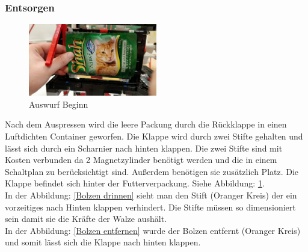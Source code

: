 \subsubsection{Entsorgen}

\begin{figure}
\vspace{-30pt}
  \begin{center}
    \includegraphics[width=0.50\textwidth]{Bilder/Ablauf_1_png/Auswurf_1}
  \end{center}
  \caption{Auswurf Beginn}
  \label{Auswurf Beginn}
  \vspace{-10pt}
\end{figure}

Nach dem Auspressen wird die leere Packung durch die Rückklappe in einen Luftdichten Container geworfen. Die Klappe wird durch zwei Stifte gehalten und lässt sich durch ein Scharnier nach hinten klappen. Die zwei Stifte sind mit Kosten verbunden da 2 Magnetzylinder benötigt werden und die in einem Schaltplan zu berücksichtigt sind. Außerdem benötigen sie zusätzlich Platz. Die Klappe befindet sich hinter der Futterverpackung. Siehe Abbildung: \ref{Auswurf Beginn}. \\

In der Abbildung: \ref{Bolzen drinnen} sieht man den Stift (Oranger Kreis) der ein vorzeitiges nach Hinten klappen verhindert. Die Stifte müssen so dimensioniert sein damit sie die Kräfte der Walze aushält. \\

In der Abbildung: \ref{Bolzen entfernen} wurde der Bolzen entfernt (Oranger Kreis) und somit lässt sich die Klappe nach hinten klappen. 

